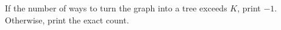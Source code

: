 If the number of ways to turn the graph into a tree exceeds $K$, print $-1$. Otherwise, print the exact count.
